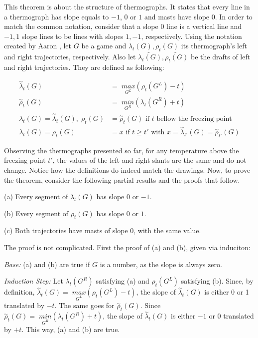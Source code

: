 This theorem is about the structure of thermographs. It states that every line in a thermograph has slope equals to ${-}1$, $0$ or $1$ and masts have slope 0. In order to match the common notation, consider that a slope 0 line is a vertical line and ${-1},1$ slope lines to be lines with slopes $1,{-}1$, respectively. Using the notation created by Aaron \cite{CGT}, let $G$ be a game and $\lambda_t(G), \rho_t(G)$ its thermograph's left and right trajectories, respectively. Also let $\tilde{\lambda_t(G)}, \tilde{\rho_t(G)}$ be the drafts of left and right trajectories. They are defined as following:

\begin{align*}
\overset{\sim}{\lambda}_t(G) &=\; \underset{G^L}{max}(\rho_t(G^L)- t)\\
\overset{\sim}{\rho}_t(G) &=\; \underset{G^R}{min}(\lambda_t(G^R) + t)\\
\lambda_t(G) = \overset{\sim}{\lambda}_t(G),\;\rho_t(G) &= \overset{\sim}{\rho}_t(G)\text{ if $t$ bellow the freezing point} \\
\lambda_t(G) = \rho_t(G) &= x \text{ if $t \ge t'$ with } x = \overset{\sim}{\lambda}_{t'}(G) = \overset{\sim}{\rho}_{t'}(G)
\end{align*}

Observing the thermographs presented so far, for any temperature above the freezing point $t'$, the values of the left and right slants are the same and do not change. Notice how the definitions do indeed match the drawings. Now, to prove the theorem, consider the following partial results and the proofs that follow.

\hspace{1cm}(a) Every segment of $\lambda_t(G)$ has slope 0 or ${-}1$.

\hspace{1cm}(b) Every segment of $\rho_t(G)$ has slope 0 or $1$.

\hspace{1cm}(c) Both trajectories have masts of slope 0, with the same value.

The proof is not complicated. First the proof of (a) and (b), given via induciton:

\textit{Base:} (a) and (b) are true if $G$ is a number, as the slope is always zero.

\textit{Induction Step:} Let $\lambda_t(G^R)$ satisfying (a) and $\rho_t(G^L)$ satisfying (b). Since, by definition, \mbox{$\overset{\sim}{\lambda}_t(G) =\; \underset{G^L}{max}(\rho_t(G^L)- t)$}, the slope of $\overset{\sim}{\lambda}_t(G)$ is either 0 or 1 translated by ${-}t$. The same goes for $\overset{\sim}{\rho}_t(G)$. Since \mbox{$\overset{\sim}{\rho}_t(G) =\; \underset{G^R}{min}(\lambda_t(G^R) + t)$}, the slope of $\overset{\sim}{\lambda}_t(G)$ is either ${-}1$ or 0 translated by ${+}t$. This way, (a) and (b) are true.

